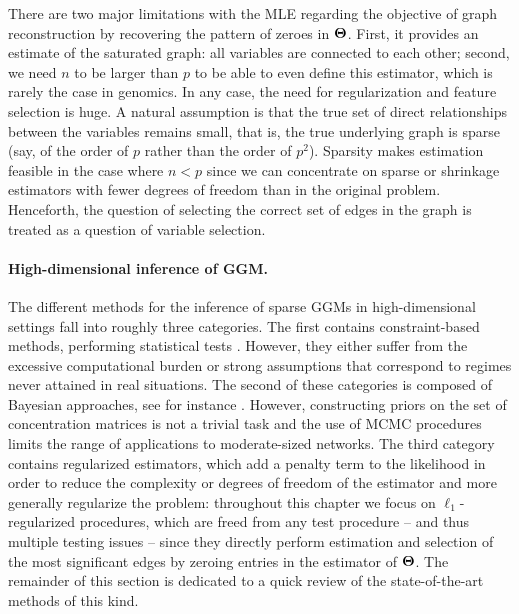 There are two  major limitations with the MLE  regarding the objective
of  graph  reconstruction  by  recovering the  pattern  of  zeroes  in
$\boldsymbol\Theta$. First, it provides an  estimate of the saturated graph: all
variables  are connected  to each  other; second,  we need  $n$ to  be
larger than  $p$ to be  able to even  define this estimator,  which is
rarely the case in genomics. In  any case, the need for regularization
and feature selection is huge.  A  natural assumption is that the true
set of direct relationships between  the variables remains small, that
is, the  true underlying  graph is  sparse (say, of  the order  of $p$
rather than the  order of $p^2$).  Sparsity  makes estimation feasible
in  the  case where  $n<p$  since  we  can  concentrate on  sparse  or
shrinkage  estimators  with  fewer  degrees of  freedom  than  in  the
original problem.   Henceforth, the question of  selecting the correct
set  of edges  in  the graph  is  treated as  a  question of  variable
selection.

\paragraph*{High-dimensional inference of GGM.}  The different methods
for the inference of sparse GGMs in high-dimensional settings fall
into roughly three categories.  The first contains constraint-based
methods, performing statistical tests
\cite{2006_JMLR_Castelo,2007_SS_drton,2008_JSPI_drton,2011_BMC_Kiiveri,2006_SAGMB_Wille}.
However, they either suffer from the excessive computational burden
\cite{2006_JMLR_Castelo,2006_SAGMB_Wille} or strong assumptions
\cite{2007_SS_drton,2008_JSPI_drton} that correspond to regimes never
attained in real situations.  The second of these categories is
composed of Bayesian approaches, see for instance
\cite{2004_JMVA_Dobra,2005_SS_Dobra,rau2012reverse,schwaller2015tree}.
However, constructing priors on the set of concentration matrices is
not a trivial task and the use of MCMC procedures limits the range of
applications to moderate-sized networks.  The third category contains
regularized estimators, which add a penalty term to the likelihood in
order to reduce the complexity or degrees of freedom of the estimator
and more generally regularize the problem: throughout this chapter we
focus on $\ell_1$-regularized procedures, which are freed from any
test procedure -- and thus multiple testing issues -- since they
directly perform estimation and selection of the most significant
edges by zeroing entries in the estimator of $\boldsymbol\Theta$.  The remainder
of this section is dedicated to a quick review of the state-of-the-art
methods of this kind.

